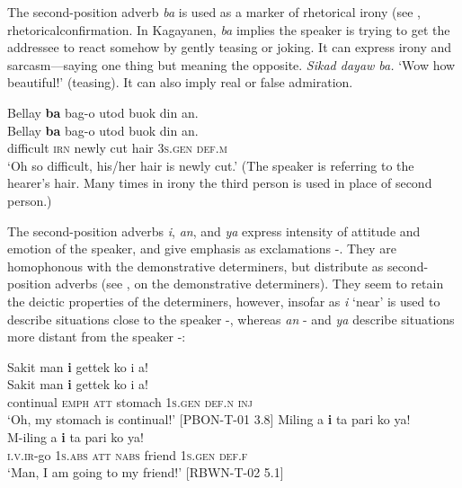 The second-position adverb \textit{ba} is used as a marker of rhetorical irony (see , rhetoricalconfirmation. In Kagayanen, \textit{ba} implies the speaker is trying to get the addressee to react somehow by gently teasing or joking. It can express irony and sarcasm---saying one thing but meaning the opposite. \textit{Sikad dayaw ba.} ‘Wow how beautiful!’ (teasing). It can also imply real or false admiration.

\ea
Bellay   \textbf{ba}  bag-o  utod  buok  din  an. \\\smallskip
 \gll Bellay   \textbf{ba}  bag-o  utod  buok  din  an. \\
difficult  \textsc{irn}  newly  cut  hair  3\textsc{s.gen}  \textsc{def.m} \\
\glt ‘Oh so difficult, his/her hair is newly cut.’ (The speaker is referring to the hearer’s hair. Many times in irony the third person is used in place of second person.)
\z

The second-position adverbs \textit{i}, \textit{an}, and \textit{ya} express intensity of attitude and emotion of the speaker, and give emphasis as exclamations -. They are homophonous with the demonstrative determiners, but distribute as second-position adverbs (see ,  on the demonstrative determiners). They seem to retain the deictic properties of the determiners, however, insofar as \textit{i} ‘near’ is used to describe situations close to the speaker -, whereas \textit{an} - and \textit{ya} describe situations more distant from the speaker -:

\ea
\label{bkm:Ref441519758}
Sakit  man  \textbf{i}    gettek  ko  i  a! \\\smallskip
 \gll Sakit  man  \textbf{i}    gettek  ko  i  a! \\
continual  \textsc{emph}  \textsc{att}  stomach  1\textsc{s.gen}  \textsc{def.n}  \textsc{inj} \\
\glt ‘Oh, my stomach is continual!’ [PBON-T-01 3.8]
\z
\ea
\label{bkm:Ref52607199}
Miling  a  \textbf{i}  ta  pari  ko  ya! \\\smallskip
 \gll M-iling  a  \textbf{i}  ta  pari  ko  ya! \\
\textsc{i.v.ir}-go  1\textsc{s.abs}  \textsc{att}  \textsc{nabs}  friend  1\textsc{s.gen}  \textsc{def.f} \\
\glt ‘Man, I am going to my friend!’ [RBWN-T-02 5.1]
\z

